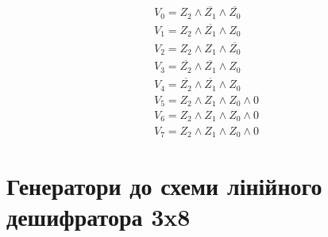 \documentclass{article}
\begin{document}
\begin{normalsize}
	\begin{Large}
			\begin{gather}
				V_0=Z_2\land \overline{Z_1}\land \overline{Z_0}\nonumber\\
				V_1=Z_2\land \overline{Z_1}\land Z_0\nonumber\\
				V_2=Z_2\land Z_1\land \overline{Z_0}\nonumber\\
				V_3=\overline{Z_2}\land \overline{Z_1}\land Z_0\nonumber\\
				V_4=\overline{Z_2}\land \overline{Z_1}\land Z_0\nonumber\\
				V_5=Z_2\land Z_1\land Z_0\land 0\nonumber\\
				V_6=Z_2\land Z_1\land Z_0\land 0\nonumber\\
				V_7=Z_2\land Z_1\land Z_0\land 0\nonumber
			\end{gather}
	\end{Large}

	\section*{Генератори до схеми лінійного дешифратора 3x8}
	\begin{figure}[H]
		\centering
		\hspace{5px}
		

\end{figure}
\end{normalsize}
\end{document}
